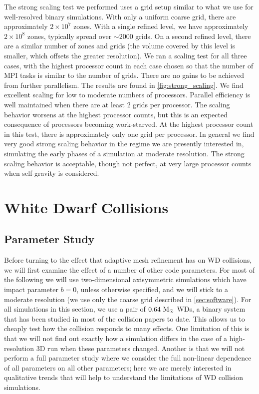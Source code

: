 \documentclass[12pt]{article}
\begin{document}
The strong scaling test we performed uses a grid setup similar to what we 
use for well-resolved binary simulations. With only a uniform coarse grid, 
there are approximately $2 \times 10^7$ zones. With a single refined level, 
we have approximately $2 \times 10^8$ zones, typically spread over $\sim 2000$ grids.
On a second refined level, there are a similar number of zones and grids 
(the volume covered by this level is smaller, which offsets the greater resolution).
We ran a scaling test for all three cases, with the 
highest processor count in each case chosen so that the number of 
MPI tasks is similar to the number of grids. There are no gains 
to be achieved from further parallelism. The results are found in 
\autoref{fig:strong_scaling}. We find excellent scaling for low to moderate numbers 
of processors. Parallel efficiency is well maintained when there are 
at least 2 grids per processor. The 
scaling behavior worsens at the highest processor counts, but this is 
an expected consequence of processors becoming work-starved. At the highest 
processor count in this test, there is approximately only one grid per processor. In general 
we find very good strong scaling behavior in the regime we are presently 
interested in, simulating the early phases of a simulation at moderate 
resolution. The strong scaling behavior is acceptable, though not perfect, 
at very large processor counts when self-gravity is considered.



\clearpage
\section{White Dwarf Collisions}
\label{sec:collisions}

\subsection{Parameter Study}
\label{sec:collision_parameters}

Before turning to the effect that adaptive mesh refinement has on WD collisions,
we will first examine the effect of a number of other code parameters. For most
of the following we will use two-dimensional axisymmetric simulations which have
impact parameter $b = 0$, unless otherwise specified, and we will stick to a
moderate resolution (we use only the coarse grid described in \autoref{sec:software}).
For all simulations in this section, we use a pair of $0.64\ \msolar$ WDs, a binary
system that has been studied in most of the collision papers to date. This allows
us to cheaply test how the collision responds to many effects. One limitation of
this is that we will not find out exactly how a simulation differs in the case of a
high-resolution 3D run when these parameters changed. Another is that we will not
perform a full parameter study where we consider the full non-linear dependence of
all parameters on all other parameters; here we are merely interested in qualitative
trends that will help to understand the limitations of WD collision simulations.
\end{document}
